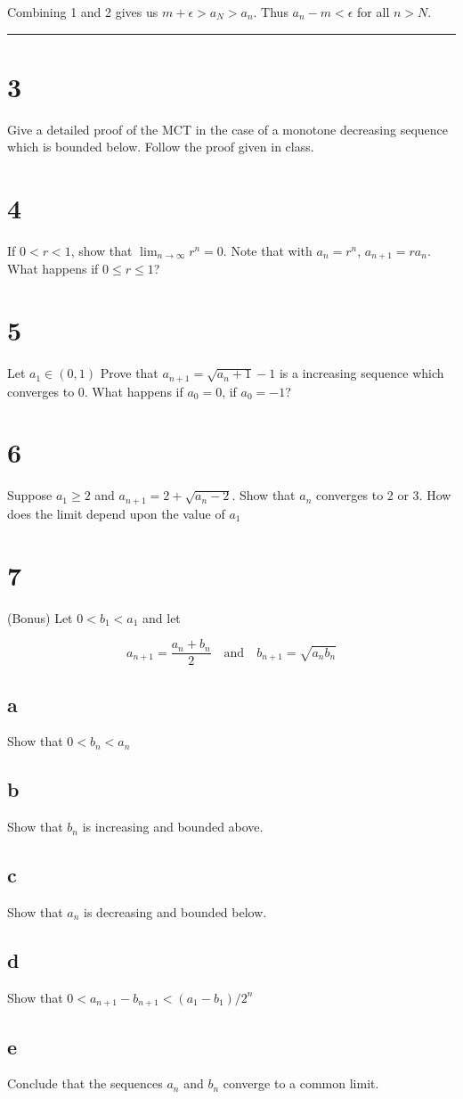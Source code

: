 \documentclass[10pt,letterpaper]{article}
\newcommand\ds{\displaystyle}
\newcommand\qedsym{\hfill \rule{2mm}{2mm}}
\begin{document}
Combining 1 and 2 gives us $m + \epsilon > a_N > a_n$.
Thus $a_n - m < \epsilon$ for all $n > N$.

\qedsym{}

\section*{3} Give a detailed proof of the MCT in the case of a monotone decreasing sequence which is bounded below. Follow the proof given in class.

\section*{4} If $0 < r < 1$, show that $\ds \lim_{n \to \infty} r^n= 0$. Note that with $a_n = r^n$, $a_{n+1} = r a_n$. What happens if $0 \leq r \leq 1$?

\section*{5} Let $a_1 \in (0, 1)$ Prove that $a_{n+1} = \sqrt{a_{n} +1} -1 $ is a increasing sequence which converges to 0. What happens if $a_0 = 0$, if $a_0 = -1$?

\section*{6} Suppose $a_1 \geq 2$ and $a_{n +1} = 2 + \sqrt{a_n - 2}$. Show that $a_n$ converges to 2 or 3. How does the limit depend upon the value of $a_1$

\section*{7} (Bonus) Let $0 < b_1 < a_1$ and let

\[a_{n+1} = \frac{a_n + b_n}{2} \quad \text{and} \quad b_{n+1} = \sqrt{a_n b_n}\]

\subsection*{a} Show that $0 < b_n < a_n$


\subsection*{b} Show that $b_n$ is increasing and bounded above.


\subsection*{c} Show that $a_n$ is decreasing and bounded below.


\subsection*{d} Show that $ 0 < a_{n+1} - b_{n+1} < (a_1 - b_1)/2^n$


\subsection*{e} Conclude that the sequences $a_n$ and $b_n$ converge to a common limit.
\end{document}

